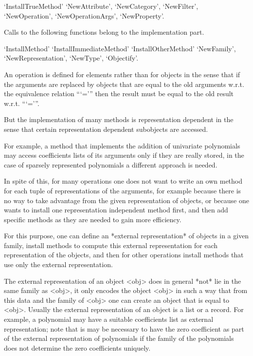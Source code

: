 `InstallTrueMethod'
`NewAttribute',
`NewCategory',
`NewFilter',
`NewOperation',
`NewOperationArgs',
`NewProperty'.

Calls to the following functions belong to the implementation part.

`InstallMethod'
`InstallImmediateMethod'
`InstallOtherMethod'
`NewFamily',
`NewRepresentation',
`NewType',
`Objectify'.



An operation is defined for elements rather than for objects in the sense
that if the arguments are replaced by objects that are equal to the old
arguments w.r.t. the equivalence relation ```=''' then the result must be
equal to the old result w.r.t. ```='''.

But the implementation of many methods is representation dependent in the
sense that certain representation dependent subobjects are accessed.

For example, a method that implements the addition of univariate
polynomials may access coefficients lists of its arguments
only if they are really stored, 
in the case of sparsely represented polynomials a different approach is
needed.

In spite of this, for many operations one does not want to write an own
method for each tuple of representations of the arguments,
for example because there is no way to take advantage from the given
representation of objects,
or because one wants to install one representation independent method
first, and then add specific methods as they are needed to gain more
efficiency.

For this purpose,
one can define an *external representation* of objects in a given family,
install methods to compute this external representation for each
representation of the objects,
and then for other operations install methods that use only the external
representation.

The external representation of an object <obj> does in general *not* lie
in the same family as <obj>,
it only encodes the object <obj> in such a way that from this data and
the family of <obj> one can create an object that is equal to <obj>.
Usually the external representation of an object is a list or a record.
For example, a polynomial may have a suitable coefficients list as
external representation;
note that is may be necessary to have the zero coefficient as part of
the external representation of polynomials if the family of the
polynomials does not determine the zero coefficients uniquely.

